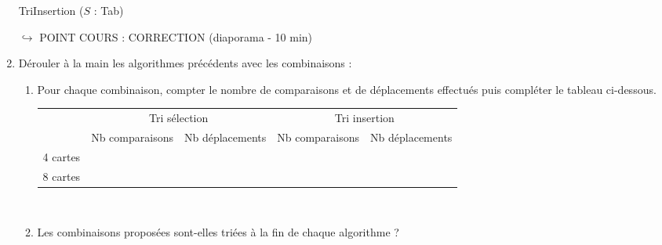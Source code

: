 \documentclass[a4paper,french]{article}
\begin{document}
\begin{enumerate}
\begin{algorithm}[H]
\DontPrintSemicolon
TriInsertion ($S$ : Tab)\;
\BlankLine
\DontPrintSemicolon
{}
\PrintSemicolon
\BlankLine 
\Deb{
\BlankLine
\BlankLine
\BlankLine
\BlankLine
\BlankLine
\BlankLine
\BlankLine
\BlankLine
\BlankLine
\BlankLine
\BlankLine
\BlankLine
\BlankLine
\BlankLine
\BlankLine
\BlankLine
\BlankLine
\BlankLine
\BlankLine
\BlankLine
\BlankLine
\BlankLine
\BlankLine
\BlankLine
\BlankLine
\BlankLine
\BlankLine
\BlankLine
\BlankLine
\BlankLine
\BlankLine
\BlankLine
\BlankLine
\BlankLine
\BlankLine
\BlankLine
\BlankLine
\BlankLine
\BlankLine
\BlankLine
\BlankLine
\BlankLine
\BlankLine
\BlankLine
\BlankLine
\BlankLine
\BlankLine
\BlankLine
\BlankLine
\BlankLine
\BlankLine
\BlankLine
\BlankLine
\BlankLine
\BlankLine
\BlankLine
\BlankLine
\BlankLine
\BlankLine
\BlankLine
\BlankLine
\BlankLine
\BlankLine
\BlankLine
\BlankLine
\BlankLine
\BlankLine
\BlankLine
\BlankLine
\BlankLine
\BlankLine
\BlankLine
\BlankLine
\BlankLine
\BlankLine
\BlankLine
\BlankLine
\BlankLine
\BlankLine
\BlankLine
\BlankLine
\BlankLine
\BlankLine
\BlankLine
\BlankLine
\BlankLine
\BlankLine
\BlankLine
\BlankLine
}
\end{algorithm}
\medskip

$\hookrightarrow$ POINT COURS : CORRECTION (diaporama - 10 min)
\medskip

\item Dérouler \og à la main \fg les algorithmes précédents avec les combinaisons :

\begin{enumerate}
\item Pour chaque combinaison, compter le nombre de comparaisons et de déplacements effectués puis compléter le tableau ci-dessous.

\setlength{\extrarowheight}{2mm}
\begin{tabular}{|c|c|c|c|c|}
\cline{2-5}
\multicolumn{1}{c|}{} &\multicolumn{2}{|c|}{Tri sélection} & \multicolumn{2}{|c|}{Tri insertion}
\\ \cline{2-5}
\multicolumn{1}{c|}{}  & Nb comparaisons & Nb déplacements & Nb comparaisons & Nb déplacements \\
\hline
4 cartes &  &   &   &   \\[2mm] \hline
8 cartes &   &   &   &   \\[2mm] \hline
\end{tabular}
\\[2mm]
\item Les combinaisons proposées sont-elles triées à la fin de chaque algorithme ?
\end{enumerate}
\medskip


\end{enumerate}
\end{document}
